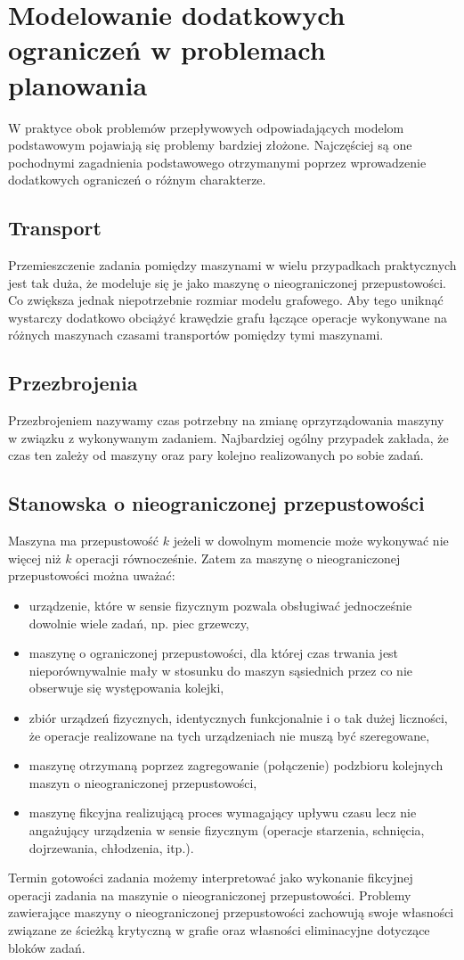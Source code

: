 \section{Modelowanie dodatkowych ograniczeń w problemach planowania}

	W praktyce obok problemów przepływowych odpowiadających modelom
	podstawowym pojawiają się problemy bardziej
	złożone. Najczęściej są one pochodnymi zagadnienia podstawowego otrzymanymi
	poprzez wprowadzenie dodatkowych ograniczeń o różnym charakterze.
	
	\subsection{Transport}
	Przemieszczenie zadania pomiędzy maszynami w wielu przypadkach praktycznych jest tak duża, że modeluje się je jako
	maszynę o nieograniczonej przepustowości. Co zwiększa jednak niepotrzebnie rozmiar modelu grafowego.
	Aby tego uniknąć wystarczy dodatkowo obciążyć krawędzie grafu łączące operacje wykonywane na różnych maszynach
	czasami transportów pomiędzy tymi maszynami.
	\subsection{Przezbrojenia}
	Przezbrojeniem nazywamy czas potrzebny na zmianę oprzyrządowania
	maszyny w związku z wykonywanym zadaniem. Najbardziej ogólny przypadek
	zakłada, że czas ten zależy od maszyny oraz pary kolejno realizowanych
	po sobie zadań.
	\subsection{Stanowska o nieograniczonej przepustowości}
	Maszyna ma przepustowość $k$ jeżeli w dowolnym momencie może wykonywać nie więcej niż $k$ operacji równocześnie.
	Zatem za maszynę o nieograniczonej przepustowości można uważać:
	\begin{itemize}
		\item urządzenie, które w sensie fizycznym pozwala obsługiwać jednocześnie
		dowolnie wiele zadań, np. piec grzewczy,
		\item maszynę o ograniczonej przepustowości, dla której czas trwania jest
		nieporównywalnie mały w stosunku do maszyn sąsiednich przez co nie
		obserwuje się występowania kolejki,
		\item zbiór urządzeń fizycznych, identycznych funkcjonalnie i o tak dużej
		liczności, że operacje realizowane na tych urządzeniach nie muszą być szeregowane,
		\item maszynę otrzymaną poprzez zagregowanie (połączenie) podzbioru kolejnych
		maszyn o nieograniczonej przepustowości,
		\item maszynę fikcyjna realizującą proces wymagający upływu czasu lecz nie
		angażujący urządzenia w sensie fizycznym (operacje starzenia, schnięcia,
		dojrzewania, chłodzenia, itp.).
	\end{itemize}
	Termin gotowości zadania możemy interpretować jako wykonanie fikcyjnej operacji zadania na maszynie o 
	nieograniczonej przepustowości. \newline
	Problemy zawierające maszyny o nieograniczonej przepustowości zachowują
	swoje własności związane ze ścieżką krytyczną w grafie oraz własności eliminacyjne dotyczące bloków zadań.
